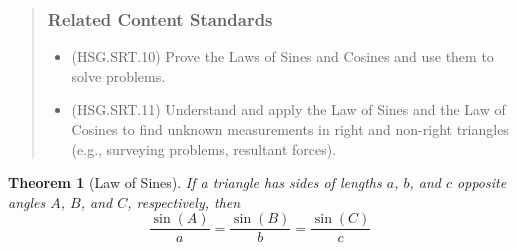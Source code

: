 \documentclass[
]{book}
\providecommand{\tightlist}{%
  \setlength{\itemsep}{0pt}\setlength{\parskip}{0pt}}
\newtheorem{theorem}{Theorem}[chapter]
\theoremstyle{definition}
\theoremstyle{definition}
\theoremstyle{definition}
\theoremstyle{remark}
\begin{document}
\begin{quote}
\hypertarget{related-content-standards-59}{%
\subsubsection*{Related Content Standards}\label{related-content-standards-59}}

\begin{itemize}
\tightlist
\item
  (HSG.SRT.10) Prove the Laws of Sines and Cosines and use them to solve problems.
\item
  (HSG.SRT.11) Understand and apply the Law of Sines and the Law of Cosines to find unknown measurements in right and non-right triangles (e.g., surveying problems, resultant forces).
\end{itemize}
\end{quote}

\begin{theorem}[Law of Sines]
\protect\hypertarget{thm:unnamed-chunk-240}{}{\label{thm:unnamed-chunk-240} {} }If a triangle has sides of lengths \(a\), \(b\), and \(c\) opposite angles \(A\), \(B\), and \(C\), respectively, then
\[\frac{\sin(A)}{a}=\frac{\sin(B)}{b} = \frac{\sin(C)}{c}\]
\end{theorem}
\end{document}
